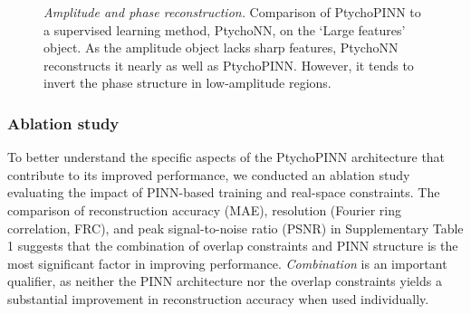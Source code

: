 \documentclass[sn-mathphys]{sn-jnl}%
\theoremstyle{thmstyleone}%
\theoremstyle{thmstyletwo}%
\theoremstyle{thmstylethree}%
\begin{document}
\begin{figure}
    \caption{ \emph{Amplitude and phase reconstruction.} Comparison of PtychoPINN to a supervised learning method, PtychoNN, on the `Large features' object. As the amplitude object lacks sharp features, PtychoNN reconstructs it nearly as well as PtychoPINN. However, it tends to invert the phase structure in low-amplitude regions.}%
    \label{fig:exp_comparison_detailed}%
\end{figure}

\subsubsection{Ablation study}

To better understand the specific aspects of the PtychoPINN architecture that contribute to its improved performance, we conducted an ablation study evaluating the impact of PINN-based training and real-space constraints. The comparison of reconstruction accuracy (MAE), resolution (Fourier ring correlation, FRC), and peak signal-to-noise ratio (PSNR) in  Supplementary Table 1  suggests that the combination of overlap constraints and PINN structure is the most significant factor in improving performance. \emph{Combination} is an important qualifier, as neither the PINN architecture nor the overlap constraints yields a substantial improvement in reconstruction accuracy when used individually.
\end{document}
